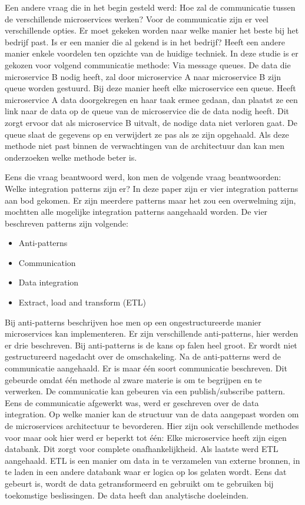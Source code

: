 Een andere vraag die in het begin gesteld werd: Hoe zal de communicatie tussen de verschillende microservices werken?
Voor de communicatie zijn er veel verschillende opties. Er moet gekeken worden naar welke manier het beste bij het bedrijf past. Is er een manier die al gekend is in het bedrijf? Heeft een andere manier enkele voordelen ten opzichte van de huidige techniek. In deze studie is er gekozen voor volgend communicatie methode: Via message queues. De data die microservice B nodig heeft, zal door microservice A naar microservice B zijn queue worden gestuurd. Bij deze manier heeft elke microservice een queue. Heeft microservice A data doorgekregen en haar taak ermee gedaan, dan plaatst ze een link naar de data op de queue van de microservice die de data nodig heeft. Dit zorgt ervoor dat als microservice B uitvalt, de nodige data niet verloren gaat. De queue slaat de gegevens op en verwijdert ze pas als ze zijn opgehaald. Als deze methode niet past binnen de verwachtingen van de architectuur dan kan men onderzoeken welke methode beter is. 

Eens die vraag beantwoord werd, kon men de volgende vraag beantwoorden: Welke integration patterns zijn er?
In deze paper zijn er vier integration patterns aan bod gekomen. Er zijn meerdere patterns maar het zou een overwelming zijn, mochtten alle mogelijke integration patterns aangehaald worden. De vier beschreven patterns zijn volgende:
\begin{itemize}
	\item Anti-patterns
	\item Communication
	\item Data integration
	\item Extract, load and transform (ETL)
\end{itemize}
Bij anti-patterns beschrijven hoe men op een ongestructureerde manier microservices kan implementeren. Er zijn verschillende anti-patterns, hier werden er drie beschreven. Bij anti-patterns is de kans op falen heel groot. Er wordt niet gestructureerd nagedacht over de omschakeling.
Na de anti-patterns werd de communicatie aangehaald. Er is maar één soort communicatie beschreven. Dit gebeurde omdat één methode al zware materie is om te begrijpen en te verwerken. De communicatie kan gebeuren via een publish/subscribe pattern.
Eens de communicatie afgewerkt was, werd er geschreven over de data integration. Op welke manier kan de structuur van de data aangepast worden om de microservices architectuur te bevorderen. Hier zijn ook verschillende methodes voor maar ook hier werd er beperkt tot één: Elke microservice heeft zijn eigen databank. Dit zorgt voor complete onafhankelijkheid.
Als laatste werd ETL aangehaald. ETL is een manier om data in te verzamelen van externe bronnen, in te laden in een andere databank waar er logica op los gelaten wordt. Eens dat gebeurt is, wordt de data getransformeerd en gebruikt om te gebruiken bij toekomstige beslissingen. De data heeft dan analytische doeleinden.

